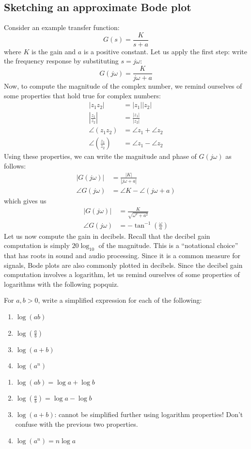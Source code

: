 \documentclass{ee122_notes}
\begin{document}
\subsection{Sketching an approximate Bode plot}
Consider an example transfer function:
\[
G(s) = \frac{K}{s + a}
\]
where \( K \) is the gain and \( a \) is a positive constant. Let us apply the first step: write the frequency response by substituting \( s = j\omega \):
\[
G(j\omega) = \frac{K}{j\omega + a}
\]
Now, to compute the magnitude of the complex number, we remind ourselves of some properties that hold true for complex numbers:
\begin{align*}
|z_1 z_2| &= |z_1||z_2| \\
\left|\frac{z_1}{z_2}\right| &= \frac{|z_1|}{|z_2|} \\
\angle (z_1 z_2) &= \angle z_1 + \angle z_2 \\
\angle \left(\frac{z_1}{z_2}\right) &= \angle z_1 - \angle z_2
\end{align*}
Using these properties, we can write the magnitude and phase of \( G(j\omega) \) as follows:
\begin{align*}
|G(j\omega)| &= \frac{|K|}{|j\omega + a
|} \\
\angle G(j\omega) &= \angle K - \angle (j\omega +
a)
\end{align*}
which gives us 
\begin{align*}
|G(j\omega)| &= \frac{K}{\sqrt{\omega^2 + a^2}} \\
\angle G(j\omega) &= -\tan^{-1}\left(\frac{\omega}{a}\right)
\end{align*}
Let us now compute the gain in decibels. Recall that the decibel gain computation is simply \( 20 \log_{10} \) of the magnitude. This is a ``notational choice'' that has roots in sound and audio processing. Since it is a common measure for signals, Bode plots are also commonly plotted in decibels. Since the decibel gain computation involves a logarithm, let us remind ourselves of some properties of logarithms with the following popquiz.
\begin{popquiz}
For $a, b > 0$, write a simplified expression for each of the following:
\begin{enumerate}
  \item $\log (ab)$
  \item $\log \left(\frac{a}{b}\right)$
  \item $\log(a + b)$
  \item $\log (a^n)$
\end{enumerate}
\popqsplit 
\begin{enumerate}
  \item $\log (ab) = \log a + \log b$
  \item $\log \left(\frac{a}{b}\right) = \log a - \log b$
  \item $\log(a + b)$:  cannot be simplified further using logarithm properties! Don't confuse with the previous two properties.
  \item $\log (a^n) = n \log a$
\end{enumerate}
\end{popquiz}
\end{document}
